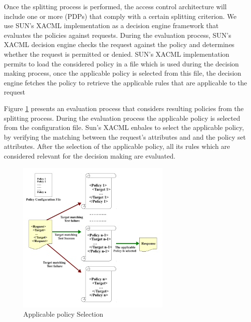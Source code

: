 Once the splitting process is performed, the access control architecture will include one or more (PDPs) that comply with a certain splitting criterion.
We use SUN's XACML implementation \cite{sunxacml} as a decision engine framework that evaluates the policies against requests.
During the evaluation process, SUN's XACML decision engine checks the request against the policy and determines whether the request is 
permitted or denied. SUN's XACML implementation permits to load the considered policy in a file which is used during the decision making process, once the applicable policy 
is selected from this file, the decision engine fetches the policy to retrieve the applicable rules that are applicable to the request


Figure \ref{requestevaluation} presents an evaluation process that considers resulting policies from the splitting process. 
During the evaluation process the applicable 
policy is selected from the configuration file. Sun's XACML enbales to select the applicable policy, by verifying the matching between the request's attributes
 and and the policy set attributes. 
After the selection of the applicable policy, all its rules which are considered relevant for the decision making are evaluated.

\begin{figure}[!h]
\begin{center}
\includegraphics[width=3in, height=3in]{requestevaluation}
\caption{Applicable policy Selection}
\label{requestevaluation}
\end{center}
\end{figure}


